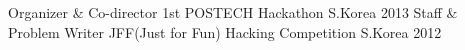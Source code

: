 \begin{cvhonors}
  \cvhonor
    {Organizer \& Co-director}
    {1st POSTECH Hackathon}
    {S.Korea}
    {2013}
  \cvhonor
    {Staff \& Problem Writer}
    {JFF(Just for Fun) Hacking Competition}
    {S.Korea}
    {2012}
\end{cvhonors}
